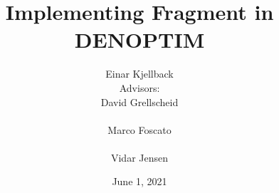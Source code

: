 \title{Implementing Fragment in DENOPTIM}
\author{Einar Kjellback
\\[1cm] Advisors:
\\[0.5cm] David Grellscheid \\
\\ Marco Foscato \\
\\ Vidar Jensen
}
\date{June 1, 2021}
